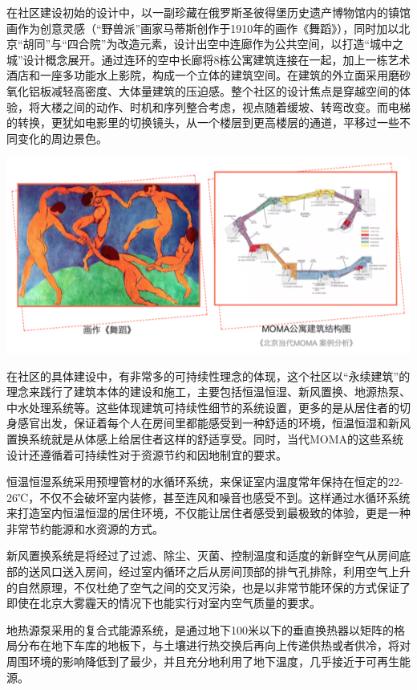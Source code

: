 \documentclass[]{book}
\begin{document}
在社区建设初始的设计中，以一副珍藏在俄罗斯圣彼得堡历史遗产博物馆内的镇馆画作为创意灵感（``野兽派''画家马蒂斯创作于1910年的画作《舞蹈》），同时加以北京``胡同''与``四合院''为改造元素，设计出空中连廊作为公共空间，以打造``城中之城''设计概念展开。通过连环的空中长廊将8栋公寓建筑连接在一起，加上一栋艺术酒店和一座多功能水上影院，构成一个立体的建筑空间。在建筑的外立面采用磨砂氧化铝板减轻高密度、大体量建筑的压迫感。整个社区的设计焦点是穿越空间的体验，将大楼之间的动作、时机和序列整合考虑，视点随着缓坡、转弯改变。而电梯的转换，更犹如电影里的切换镜头，从一个楼层到更高楼层的通道，平移过一些不同变化的周边景色。

\includegraphics[width=8.33in]{images/moma5}

在社区的具体建设中，有非常多的可持续性理念的体现，这个社区以``永续建筑''的理念来践行了建筑本体的建设和施工，主要包括恒温恒湿、新风置换、地源热泵、中水处理系统等。这些体现建筑可持续性细节的系统设置，更多的是从居住者的切身感官出发，保证着每个人在房间里都能感受到一种舒适的环境，恒温恒湿和新风置换系统就是从体感上给居住者这样的舒适享受。同时，当代MOMA的这些系统设计还遵循着可持续性对于资源节约和因地制宜的要求。

恒温恒湿系统采用预埋管材的水循环系统，来保证室内温度常年保持在恒定的22-26℃，不仅不会破坏室内装修，甚至连风和噪音也感受不到。这样通过水循环系统来打造室内恒温恒湿的居住环境，不仅能让居住者感受到最极致的体验，更是一种非常节约能源和水资源的方式。

新风置换系统是将经过了过滤、除尘、灭菌、控制温度和适度的新鲜空气从房间底部的送风口送入房间，经过室内循环之后从房间顶部的排气孔排除，利用空气上升的自然原理，不仅杜绝了空气之间的交叉污染，也是以非常节能环保的方式保证了即使在北京大雾霾天的情况下也能实行对室内空气质量的要求。

地热源泵采用的复合式能源系统，是通过地下100米以下的垂直换热器以矩阵的格局分布在地下车库的地板下，与土壤进行热交换后再向上传递供热或者供冷，将对周围环境的影响降低到了最少，并且充分地利用了地下温度，几乎接近于可再生能源。
\end{document}
